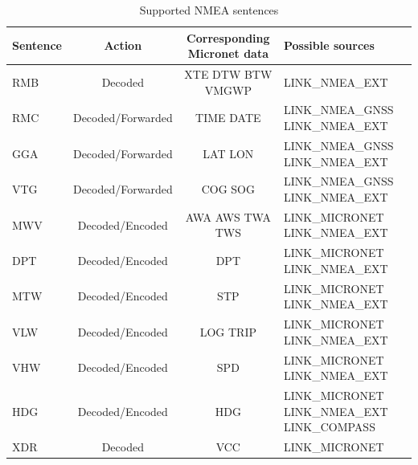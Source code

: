 \documentclass{report}
\begin{document}
\begin{table}[h]
	\small
	\begin{tabular}{|l|c|c|p{5cm}|}
		\hline
		\textbf{Sentence} & \textbf{Action}  & \textbf{Corresponding Micronet data} & \textbf{Possible sources} \\
		\hline
		RMB & Decoded & XTE DTW BTW VMGWP & LINK\_NMEA\_EXT \\
		\hline
		RMC & Decoded/Forwarded & TIME DATE & LINK\_NMEA\_GNSS LINK\_NMEA\_EXT \\
		\hline
		GGA & Decoded/Forwarded & LAT LON & LINK\_NMEA\_GNSS LINK\_NMEA\_EXT \\
		\hline
		VTG & Decoded/Forwarded & COG SOG & LINK\_NMEA\_GNSS LINK\_NMEA\_EXT \\
		\hline
		MWV & Decoded/Encoded & AWA AWS TWA TWS & LINK\_MICRONET LINK\_NMEA\_EXT \\
		\hline
		DPT & Decoded/Encoded & DPT & LINK\_MICRONET LINK\_NMEA\_EXT \\
		\hline
		MTW & Decoded/Encoded & STP & LINK\_MICRONET LINK\_NMEA\_EXT \\
		\hline
		VLW & Decoded/Encoded & LOG TRIP & LINK\_MICRONET LINK\_NMEA\_EXT \\
		\hline
		VHW & Decoded/Encoded & SPD & LINK\_MICRONET LINK\_NMEA\_EXT \\
		\hline
		HDG & Decoded/Encoded & HDG & LINK\_MICRONET LINK\_NMEA\_EXT LINK\_COMPASS \\
		\hline
		XDR & Decoded & VCC & LINK\_MICRONET \\
		\hline
	\end{tabular}
	\caption{Supported NMEA sentences}
	\label{table:nmeasentences}
\end{table}
\end{document}
